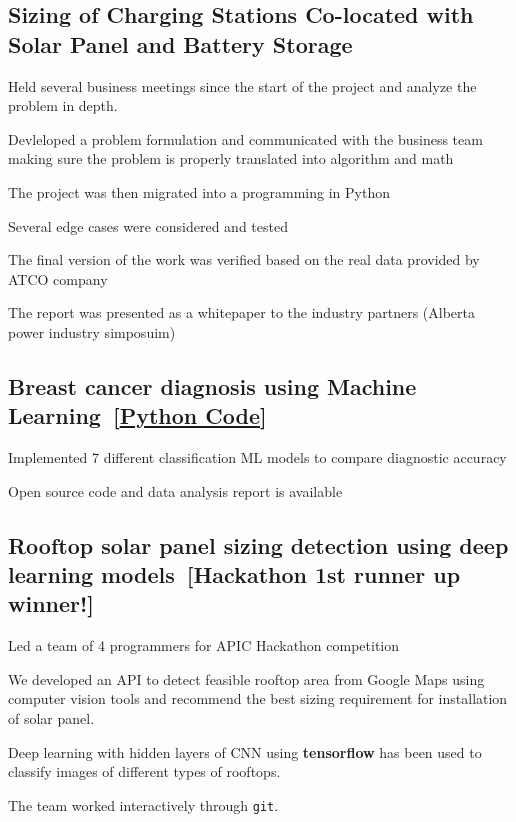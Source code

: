 \documentclass[letter,11pt]{article}
\begin{document}
	\subsection{Sizing of Charging Stations Co-located with Solar Panel and Battery Storage}
\begin{zitemize}
	\item Held several business meetings since the start of the project and analyze the problem in depth.
	\item Devleloped a problem formulation and communicated with the business team making sure the problem is properly translated into algorithm and math
	\item The project was then migrated into a programming in Python
	\item Several edge cases were considered and tested
	\item The final version of the work was verified based on the real data provided by ATCO company
	\item The report was presented as a whitepaper to the industry partners (Alberta power industry simposuim)
\end{zitemize}


\subsection{Breast cancer diagnosis using Machine Learning~[\href{https://github.com/Hadi2525/applied_ML/blob/master/Breast_cancer_ML/BC_ML.ipynb}{Python Code}]}
\begin{zitemize}
	\item Implemented 7 different classification ML models to compare diagnostic accuracy
	\item Open source code and data analysis report is available
\end{zitemize}	
\subsection{Rooftop solar panel sizing detection using deep learning models~[Hackathon 1st runner up winner!]}
\begin{zitemize}
 \item Led a team of 4 programmers for APIC Hackathon competition 
	\item We developed an API to detect feasible rooftop area from Google Maps using computer vision tools and recommend the best sizing requirement for installation of solar panel. 
	\item Deep learning with hidden layers of CNN using \textbf{tensorflow} has been used to classify images of different types of rooftops. 
	\item The team worked interactively through \texttt{git}.
\end{zitemize}
\end{document}
